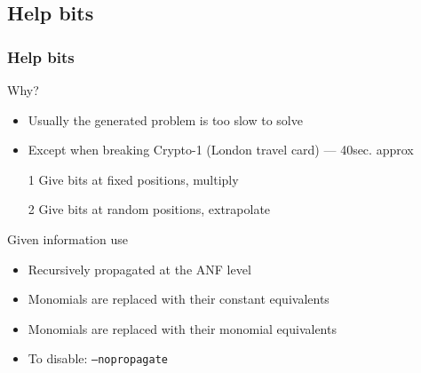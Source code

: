 \documentclass[xcolor=usenames,xcolor=svgnames,table,slidestop,compress,mathserif]{beamer}
\begin{document}
\subsection{Help bits}

\frame
{\frametitle{Help bits}
\begin{beamerboxesrounded}[shadow=true]{Why?}
\begin{itemize}
 \item Usually the generated problem is too slow to solve
 \item Except when breaking Crypto-1 (London travel card) --- 40sec. approx
 \item[1] Give bits at fixed positions, multiply
 \item[2] Give bits at random positions, extrapolate
\end{itemize}
\end{beamerboxesrounded}

\bigskip

\begin{beamerboxesrounded}[shadow=true]{Given information use}
\begin{itemize}
\item Recursively propagated at the ANF level
\item Monomials are replaced with their constant equivalents
\item Monomials are replaced with their monomial equivalents
\item To disable: \texttt{--nopropagate}
\end{itemize}
\end{beamerboxesrounded}
}
\end{document}

